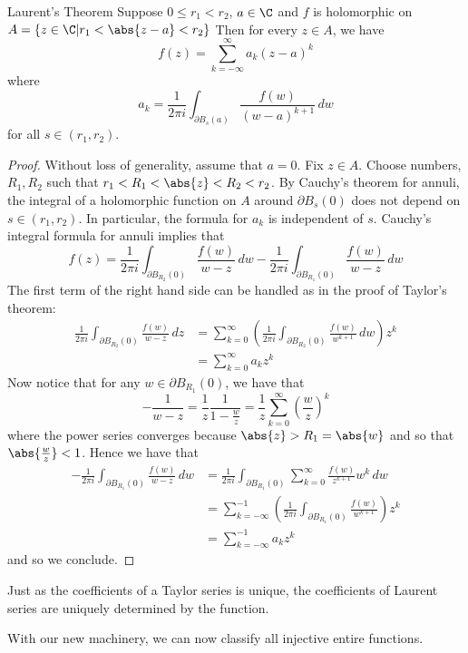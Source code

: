 \documentclass[a4paper]{article}
\begin{document}
\begin{thm}{Laurent's Theorem}{} Suppose $0\leq r_1<r_2$, $a\in\C$ and $f$ is holomorphic on $A=\{z\in\C|r_1<\abs{z-a}<r_2\}$ Then for every $z\in A$, we have $$f(z)=\sum_{k=-\infty}^\infty a_k(z-a)^k$$ where $$a_k=\frac{1}{2\pi i}\int_{\partial B_s(a)}\frac{f(w)}{(w-a)^{k+1}}\,dw$$ for all $s\in(r_1,r_2)$. \tcbline
\begin{proof}
Without loss of generality, assume that $a=0$. Fix $z\in A$. Choose numbers, $R_1,R_2$ such that $r_1<R_1<\abs{z}<R_2<r_2$. By Cauchy's theorem for annuli, the integral of a holomorphic function on $A$ around $\partial B_s(0)$ does not depend on $s\in(r_1,r_2)$. In particular, the formula for $a_k$ is independent of $s$. Cauchy's integral formula for annuli implies that $$
f(z)=\frac{1}{2\pi i}\int_{\partial B_{R_2}(0)}\frac{f(w)}{w-z}\,dw-\frac{1}{2\pi i}\int_{\partial B_{R_1}(0)}\frac{f(w)}{w-z}\,dw$$
The first term of the right hand side can be handled as in the proof of Taylor's theorem: 
\begin{align*}
\frac{1}{2\pi i}\int_{\partial B_{R_2}(0)}\frac{f(w)}{w-z}\,dz&=\sum_{k=0}^\infty\left(\frac{1}{2\pi i}\int_{\partial B_{R_2}(0)}\frac{f(w)}{w^{k+1}}\,dw\right)z^k\\
&=\sum_{k=0}^\infty a_kz^k
\end{align*}
Now notice that for any $w\in\partial B_{R_1}(0)$, we have that $$-\frac{1}{w-z}=\frac{1}{z}\frac{1}{1-\frac{w}{z}}=\frac{1}{z}\sum_{k=0}^\infty\left(\frac{w}{z}\right)^k$$ where the power series converges because $\abs{z}>R_1=\abs{w}$ and so that $\abs{\frac{w}{z}}<1$. Hence we have that 
\begin{align*}
-\frac{1}{2\pi i}\int_{\partial B_{R_1}(0)}\frac{f(w)}{w-z}\,dw&=\frac{1}{2\pi i}\int_{\partial B_{R_1}(0)}\sum_{k=0}^\infty\frac{f(w)}{z^{k+1}}w^k\,dw\\
&=\sum_{k=-\infty}^{-1}\left(\frac{1}{2\pi i}\int_{\partial B_{R_1}(0)}\frac{f(w)}{w^{k+1}}\right)z^k\tag{Uniform Convergence}\\
&=\sum_{k=-\infty}^{-1}a_kz^k
\end{align*}
and so we conclude. 
\end{proof}
\end{thm}

Just as the coefficients of a Taylor series is unique, the coefficients of Laurent series are uniquely determined by the function. 

With our new machinery, we can now classify all injective entire functions. 
\end{document}
